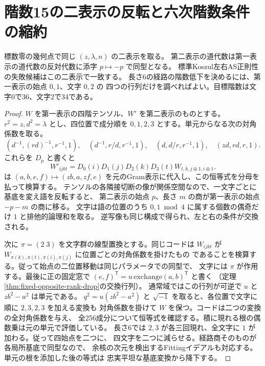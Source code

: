 \section{階数15の二表示の反転と六次階数条件の縮約}
\label{sec:rank-fifteen-word-symmetries}
\begin{theorem}\label{thm:rank-fifteen-word-symmetries}
標数零の幾何点で同じ $(z,\lambda,n)$ の二表示を取る。
第二表示の道代数は第一表示の道代数の反対代数に添字 $p\mapsto-p$ で同型となる。
標準Koszul左右AS正則性の失敗候補はこの二表示で一致する。
長さ6の経路の階数低下を決めるには、第一表示の始点 $0,1$、文字 $0,2$ の
四つの行列だけを調べればよい。目標階数は文字0で36、文字2で34である。
\end{theorem}
\begin{proof}
$W$ を第一表示の四階テンソル、$W'$ を第二表示のものとする。$r^2=z,d^2=\lambda$
とし、四位置で成分順を $0,1,2,3$ とする。単元からなる次の対角係数を取る。
\[
 (d^{-1},(rd)^{-1},r^{-1},1),\quad
 (d^{-1},r/d,r^{-1},1),\quad
 (d,d/r,r^{-1},1),\quad(zd,rd,r,1).
\]
これらを $D_p$ と書くと
\[
 W'_{ijkt}=D_0(i)D_1(j)D_2(k)D_3(t)W_{t,k,j\oplus1,i\oplus1}.
\]
 は
$(a,b,e,f)\mapsto(zb,a,zf,e)$ を元のGram表示に代入し、この恒等式を分母を払って検算する。
テンソルの各隣接切断の像が関係空間なので、一文字ごとに基底を変え語を反転すると、
第二表示の始点 $p$、長さ $m$ の商が第一表示の始点 $-p-m$ の商に移る。
文字は語の位置のうち $0,1\bmod4$ に属する個数の偶奇だけ $1$ と排他的論理和を取る。
逆写像も同じ構成で得られ、左と右の条件が交換される。

次に $\pi=(2\;3)$ を文字群の線型置換とする。同じコードは
$W_{ijkt}$ が $W_{\pi(k),\pi(t),\pi(i),\pi(j)}$ に位置ごとの対角係数を掛けたもの
であることを検算する。従って始点の二位置移動は同じパラメータでの同型で、
文字には $\pi$ が作用する。最後に正の固定窓で
$(e,f)^{\mathsf T}=u\,\mathrm{exchange}(a,b)^{\mathsf T}$ と書く
（定理\ref{thm:fixed-opposite-rank-drop}の交換行列）。
通常域ではこの行列が可逆で $u$ と $zb^2-a^2$ は単元である。
$q^2=u(zb^2-a^2)$ と $\sqrt{-1}$ を取ると、各位置で文字に順に $2,3,2,3$ を加える変換も
対角係数を掛けて $W$ を保つ。コードは二つの変換の全対角係数を与え、
全256成分について恒等式を確認する。積に現れる根の偶数乗は元の単元で評価している。
長さ6では $2,3$ が各三回現れ、全文字に $1$ が加わる。従って四始点を二つに、
四文字を二つに減らせる。経路商そのものが各局所基底で同型なので、
余核の次元を検出するFittingイデアルも対応する。単元の根を添加した後の等式は
忠実平坦な基底変換から降下する。
\end{proof}

